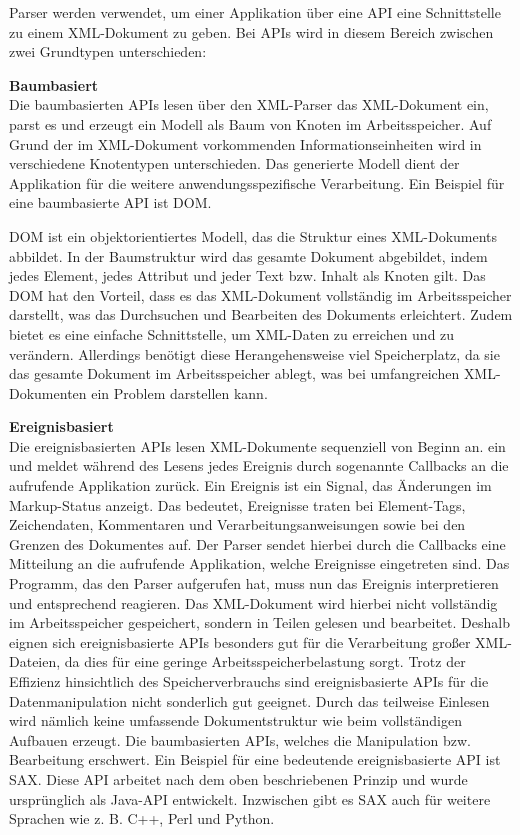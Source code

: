 Parser werden verwendet, um einer Applikation über eine \ac{API} eine Schnittstelle zu einem \ac{XML}-Dokument zu geben.
Bei \ac{API}s wird in diesem Bereich zwischen zwei Grundtypen unterschieden: \cite*[405]{Becher2022}

\textbf{Baumbasiert}\\
Die baumbasierten \ac{API}s lesen über den \ac{XML}-Parser das \ac{XML}-Dokument ein,
parst es und erzeugt ein Modell als Baum von Knoten im Arbeitsspeicher.
Auf Grund der im \ac{XML}-Dokument vorkommenden Informationseinheiten wird in verschiedene Knotentypen unterschieden.
Das generierte Modell dient der Applikation für die weitere anwendungsspezifische Verarbeitung.
Ein Beispiel für eine baumbasierte \ac{API} ist \ac{DOM}.

\ac{DOM} ist ein objektorientiertes Modell, das die Struktur eines \ac{XML}-Dokuments abbildet.
In der Baumstruktur wird das gesamte Dokument abgebildet, indem jedes Element, jedes Attribut und jeder Text bzw. Inhalt als Knoten gilt.
Das \ac{DOM} hat den Vorteil, dass es das \ac{XML}-Dokument vollständig im Arbeitsspeicher darstellt, was das Durchsuchen und Bearbeiten des Dokuments erleichtert.
Zudem bietet es eine einfache Schnittstelle, um XML-Daten zu erreichen und zu verändern.
Allerdings benötigt diese Herangehensweise viel Speicherplatz,
da sie das gesamte Dokument im Arbeitsspeicher ablegt, was bei umfangreichen \ac{XML}-Dokumenten ein Problem darstellen kann. \cite*[413,414]{Becher2022}


\textbf{Ereignisbasiert}\\
Die ereignisbasierten \ac{API}s lesen \ac{XML}-Dokumente sequenziell von Beginn an.
ein und meldet während des Lesens jedes Ereignis durch sogenannte Callbacks an die aufrufende Applikation zurück.
Ein Ereignis ist ein Signal, das Änderungen im Markup-Status anzeigt.
Das bedeutet, Ereignisse traten bei Element-Tags, Zeichendaten, Kommentaren und Verarbeitungsanweisungen sowie bei den Grenzen des Dokumentes auf.
Der Parser sendet hierbei durch die Callbacks eine Mitteilung an die aufrufende Applikation, welche Ereignisse eingetreten sind.
Das Programm, das den Parser aufgerufen hat, muss nun das Ereignis interpretieren und entsprechend reagieren.
Das \ac{XML}-Dokument wird hierbei nicht vollständig im Arbeitsspeicher gespeichert, sondern in Teilen gelesen und bearbeitet.
Deshalb eignen sich ereignisbasierte \ac{API}s besonders gut für die Verarbeitung großer \ac{XML}-Dateien, da dies für eine geringe Arbeitsspeicherbelastung sorgt.
Trotz der Effizienz hinsichtlich des Speicherverbrauchs sind ereignisbasierte \ac{API}s für die Datenmanipulation nicht sonderlich gut geeignet.
Durch das teilweise Einlesen wird nämlich keine umfassende Dokumentstruktur wie beim vollständigen Aufbauen erzeugt. Die baumbasierten \ac{API}s,
welches die Manipulation bzw. Bearbeitung erschwert.
Ein Beispiel für eine bedeutende ereignisbasierte \ac{API} ist \ac{SAX}.
Diese \ac{API} arbeitet nach dem oben beschriebenen Prinzip und wurde ursprünglich als Java-\ac{API} entwickelt. Inzwischen gibt es \ac{SAX} auch für weitere Sprachen wie
z. B. C++, Perl und Python. \cite*[405]{Becher2022}


